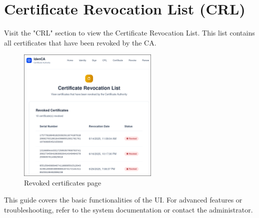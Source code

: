 \section{Certificate Revocation List (CRL)}
Visit the "CRL" section to view the Certificate Revocation List. 
This list contains all certificates that have been revoked by the CA. 
\begin{figure}[h!]
    \centering
    \includegraphics[keepaspectratio, width=0.6\textwidth]{Pic/11_crl.png}
    \caption{Revoked certificates page}
    \label{fig:crl-page}
\end{figure}


This guide covers the basic functionalities of the UI. For advanced features or troubleshooting, refer to the system documentation or contact the administrator.